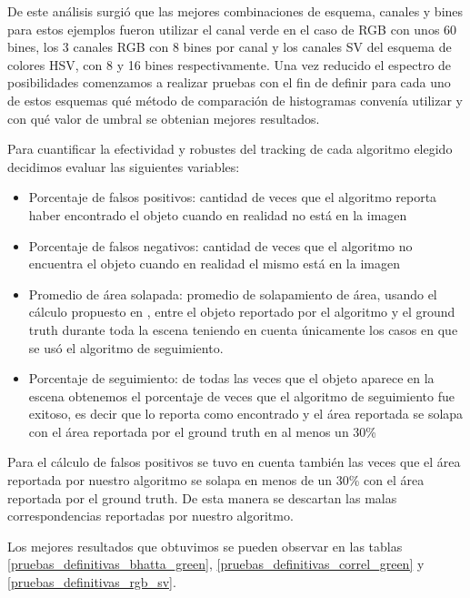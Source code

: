 De este análisis surgió que las mejores combinaciones de esquema, canales y bines para estos ejemplos fueron utilizar el canal verde en el caso de RGB con unos 60 bines, los 3 canales RGB con 8 bines por canal y los canales SV del esquema de colores HSV, con 8 y 16 bines respectivamente. Una vez reducido el espectro de posibilidades comenzamos a realizar pruebas con el fin de definir para cada uno de estos esquemas qué método de comparación de histogramas convenía utilizar y con qué valor de umbral se obtenian mejores resultados.

Para cuantificar la efectividad y robustes del tracking de cada algoritmo elegido decidimos evaluar las siguientes variables:
\begin{itemize}
	\item Porcentaje de falsos positivos: cantidad de veces que el algoritmo reporta haber encontrado el objeto cuando en realidad no está en la imagen
	\item Porcentaje de falsos negativos: cantidad de veces que el algoritmo no encuentra el objeto cuando en realidad el mismo está en la imagen
	\item Promedio de área solapada: promedio de solapamiento de área, usando el cálculo propuesto en \cite{everinghampascal}, entre el objeto reportado por el algoritmo y el ground truth durante toda la escena teniendo en cuenta únicamente los casos en que se usó el algoritmo de seguimiento.
	\item Porcentaje de seguimiento: de todas las veces que el objeto aparece en la escena obtenemos el porcentaje de veces que el algoritmo de seguimiento fue exitoso, es decir que lo reporta como encontrado y el área reportada se solapa con el área reportada por el ground truth en al menos un 30\%
\end{itemize}

Para el cálculo de falsos positivos se tuvo en cuenta también las veces que el área reportada por nuestro algoritmo se solapa en menos de un 30\% con el área reportada por el ground truth. De esta manera se descartan las malas correspondencias reportadas por nuestro algoritmo.

Los mejores resultados que obtuvimos se pueden observar en las tablas \ref{pruebas_definitivas_bhatta_green}, \ref{pruebas_definitivas_correl_green} y \ref{pruebas_definitivas_rgb_sv}.

